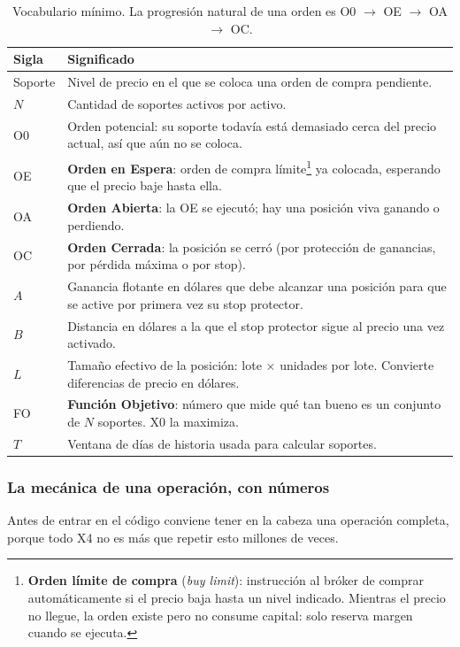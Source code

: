 \documentclass[11pt,a4paper]{article}
\begin{document}
\begin{table}[h]
\centering
\small
\begin{tabularx}{\linewidth}{@{}l X@{}}
\toprule
\textbf{Sigla} & \textbf{Significado} \\
\midrule
Soporte & Nivel de precio en el que se coloca una orden de compra pendiente. \\
$N$ & Cantidad de soportes activos por activo. \\
O0 & Orden potencial: su soporte todavía está demasiado cerca del precio actual, así que aún no se coloca. \\
OE & \textbf{Orden en Espera}: orden de compra límite\footnote{\textbf{Orden límite de compra}
(\textit{buy limit}): instrucción al bróker de comprar automáticamente si el precio baja
hasta un nivel indicado. Mientras el precio no llegue, la orden existe pero no consume
capital: solo reserva margen cuando se ejecuta.} ya colocada, esperando que el precio baje hasta ella. \\
OA & \textbf{Orden Abierta}: la OE se ejecutó; hay una posición viva ganando o perdiendo. \\
OC & \textbf{Orden Cerrada}: la posición se cerró (por protección de ganancias, por pérdida máxima o por stop). \\
$A$ & Ganancia flotante en dólares que debe alcanzar una posición para que se active por primera vez su stop protector. \\
$B$ & Distancia en dólares a la que el stop protector sigue al precio una vez activado. \\
$L$ & Tamaño efectivo de la posición: lote $\times$ unidades por lote. Convierte diferencias de precio en dólares. \\
FO & \textbf{Función Objetivo}: número que mide qué tan bueno es un conjunto de $N$ soportes. X0 la maximiza. \\
$T$ & Ventana de días de historia usada para calcular soportes. \\
\bottomrule
\end{tabularx}
\caption{Vocabulario mínimo. La progresión natural de una orden es O0 $\to$ OE $\to$ OA $\to$ OC.}
\label{tab:vocab}
\end{table}

\subsubsection{La mecánica de una operación, con números}

Antes de entrar en el código conviene tener en la cabeza una operación completa, porque
todo X4 no es más que repetir esto millones de veces.
\end{document}
